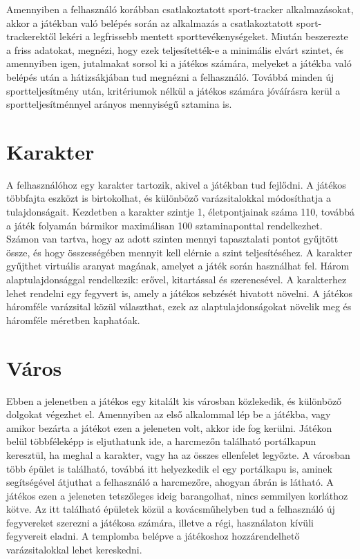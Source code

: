 Amennyiben a felhasználó korábban csatlakoztatott sport-tracker alkalmazásokat, akkor a játékban való belépés során az alkalmazás a csatlakoztatott sport-trackerektől lekéri a legfrissebb mentett sporttevékenységeket. 
Miután beszerezte a friss adatokat, megnézi, hogy ezek teljesítették-e a minimális elvárt szintet, és amennyiben igen, jutalmakat sorsol ki a játékos számára, melyeket a játékba való belépés után a hátizsákjában tud megnézni a felhasználó. 
Továbbá minden új sportteljesítmény után, kritériumok nélkül a játékos számára jóváírásra kerül a sportteljesítménnyel arányos mennyiségű sztamina is. 

\section{Karakter}
\label{karakter}
A felhasználóhoz egy karakter tartozik, akivel a játékban tud fejlődni. 
A játékos többfajta eszközt is birtokolhat, és különböző varázsitalokkal módosíthatja a tulajdonságait. 
Kezdetben a karakter szintje 1, életpontjainak száma 110, továbbá a játék folyamán bármikor maximálisan 100 sztaminaponttal rendelkezhet. 
Számon van tartva, hogy az adott szinten mennyi tapasztalati pontot gyűjtött össze, és hogy összességében mennyit kell elérnie a szint teljesítéséhez. 
A karakter gyűjthet virtuális aranyat magának, amelyet a játék során használhat fel. 
Három alaptulajdonsággal rendelkezik: erővel, kitartással és szerencsével. 
A karakterhez lehet rendelni egy fegyvert is, amely a játékos sebzését hivatott növelni.
A játékos háromféle varázsital közül választhat, ezek az alaptulajdonságokat növelik meg és háromféle méretben kaphatóak. 

\section{Város}
\label{varos}


Ebben a jelenetben a játékos egy kitalált kis városban közlekedik, és különböző dolgokat végezhet el. 
Amennyiben az első alkalommal lép be a játékba, vagy amikor bezárta a játékot ezen a jeleneten volt, akkor ide fog kerülni. 
Játékon belül többféleképp is eljuthatunk ide, a harcmezőn található portálkapun keresztül, ha meghal a karakter, vagy ha az összes ellenfelet legyőzte. 
A városban több épület is található, továbbá itt helyezkedik el egy portálkapu is, aminek segítségével átjuthat a felhasználó a harcmezőre, ahogyan  ábrán is látható. 
A játékos ezen a jeleneten tetszőleges ideig barangolhat, nincs semmilyen korláthoz kötve. 
Az itt található épületek közül a kovácsműhelyben tud a felhasználó új fegyvereket szerezni a játékosa számára, illetve a régi, használaton kívüli fegyvereit eladni.
A templomba belépve a játékoshoz hozzárendelhető varázsitalokkal lehet kereskedni. 

